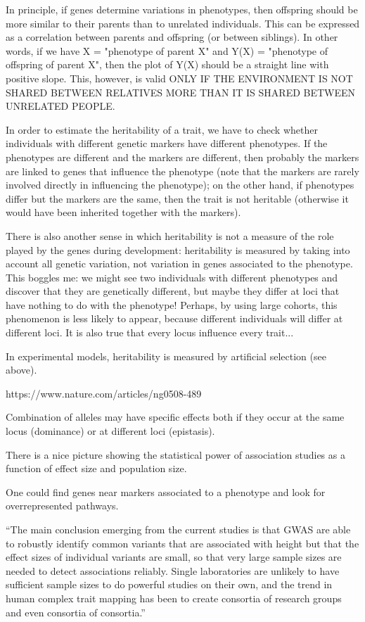 \documentclass[../main.tex]{subfiles}
\begin{document}
In principle, if genes determine variations in phenotypes, then 
offspring should be more similar to their parents than to unrelated 
individuals. This can be expressed as a correlation between parents and 
offspring (or between siblings). In other words, if we have X = 
"phenotype of parent X" and Y(X) = "phenotype of offspring of parent X", 
then the plot of Y(X) should be a straight line with positive slope. 
This, however, is valid ONLY IF THE ENVIRONMENT IS NOT SHARED BETWEEN 
RELATIVES MORE THAN IT IS SHARED BETWEEN UNRELATED PEOPLE.

In order to estimate the heritability of a trait, we have to check 
whether individuals with different genetic markers have different 
phenotypes. If the phenotypes are different and the markers are 
different, then probably the markers are linked to genes that influence 
the phenotype (note that the markers are rarely involved directly in 
influencing the phenotype); on the other hand, if phenotypes differ but 
the markers are the same, then the trait is not heritable (otherwise it 
would have been inherited together with the markers).

There is also another sense in which heritability is not a measure of 
the role played by the genes during development: heritability is 
measured by taking into account all genetic variation, not variation in 
genes associated to the phenotype. This boggles me: we might see two 
individuals with different phenotypes and discover that they are 
genetically different, but maybe they differ at loci that have nothing 
to do with the phenotype! Perhaps, by using large cohorts, this 
phenomenon is less likely to appear, because different individuals will 
differ at different loci. It is also true that every locus influence 
every trait...

In experimental models, heritability is measured by artificial selection 
(see above).

https://www.nature.com/articles/ng0508-489

Combination of alleles may have specific effects both if they occur at 
the same locus (dominance) or at different loci (epistasis). 

There is a nice picture showing the statistical power of association 
studies as a function of effect size and population size.

One could find genes near markers associated to a phenotype and look for 
overrepresented pathways.

\enquote{The main conclusion emerging from the current studies is that 
GWAS are able to robustly identify common variants that are associated 
with height but that the effect sizes of individual variants are small, 
so that very large sample sizes are needed to detect associations 
reliably. Single laboratories are unlikely to have sufficient sample 
sizes to do powerful studies on their own, and the trend in human 
complex trait mapping has been to create consortia of research groups 
and even consortia of consortia.}
\end{document}

